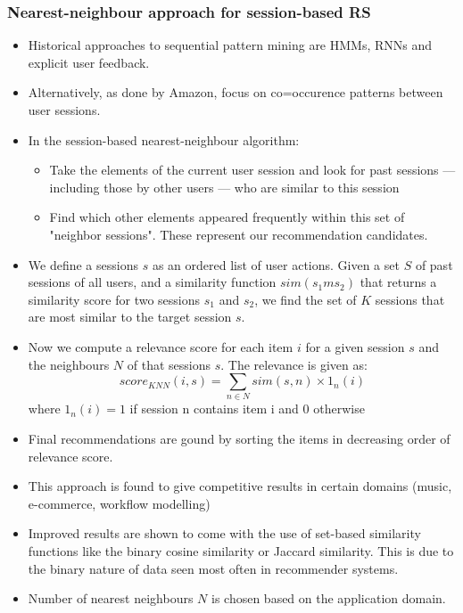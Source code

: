 \documentclass{article}
\begin{document}
\subsubsection{Nearest-neighbour approach for session-based RS}
\begin{itemize}
    \item Historical approaches to sequential pattern mining are HMMs, RNNs and explicit user feedback.
    
    \item Alternatively, as done by Amazon, focus on co=occurence patterns between user sessions. 
    
    \item In the session-based nearest-neighbour algorithm:
    \begin{itemize}
        \item Take the elements of the current user session and look for past sessions — including those by other users — who are similar to this session
        
        \item Find which other elements appeared frequently within this set of "neighbor sessions". These represent our recommendation candidates.
    \end{itemize}
    
    \item We define a sessions $s$ as an ordered list of user actions. Given a set $S$ of past sessions of all users, and a similarity function $sim(s_1m s_2)$ that returns a similarity score for two sessions $s_1$ and $s_2$, we find the set of $K$ sessions that are most similar to the target session $s$.
    
    \item Now we compute a relevance score for each item $i$ for a given session $s$ and the neighbours $N$ of that sessions $s$. The relevance is given as:
    \begin{equation}
        score_{KNN}(i, s) = \sum_{n \in N} sim(s, n) \times 1_n(i)
    \end{equation}
    where $1_n(i) = 1$ if session n contains item i and 0 otherwise
    
    \item Final recommendations are gound by sorting the items in decreasing order of relevance score. 
    
    \item This approach is found to give competitive results in certain domains (music, e-commerce, workflow modelling)
    
    \item Improved results are shown to come with the use of set-based similarity functions like the binary cosine similarity or Jaccard similarity. This is due to the binary nature of data seen most often in recommender systems.
    
    \item Number of nearest neighbours $N$ is chosen based on the application domain.
\end{itemize}
\end{document}
